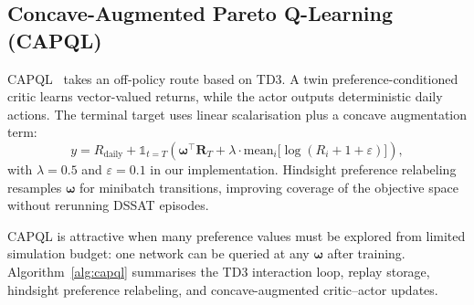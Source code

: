 \subsection{Concave-Augmented Pareto Q-Learning (CAPQL)}
\label{subsec:capql}

CAPQL~\cite{lu2023capql} takes an off-policy route based on TD3. A twin
preference-conditioned critic learns vector-valued returns, while the actor
outputs deterministic daily actions. The terminal target uses linear
scalarisation plus a concave augmentation term:
\begin{equation}
  y = R_{\text{daily}} + \mathbb{1}_{t=T}\!\left(
    \boldsymbol{\omega}^{\top}\mathbf{R}_T
    + \lambda \cdot \mathrm{mean}_i\big[\log(R_i + 1 + \varepsilon)\big]
  \right),
  \label{eq:capql_target}
\end{equation}
with $\lambda=0.5$ and $\varepsilon=0.1$ in our implementation. Hindsight
preference relabeling resamples $\boldsymbol{\omega}$ for minibatch
transitions, improving coverage of the objective space without rerunning
DSSAT episodes.

CAPQL is attractive when many preference values must be explored from limited
simulation budget: one network can be queried at any $\boldsymbol{\omega}$ after
training.
Algorithm~\ref{alg:capql} summarises the TD3 interaction loop, replay storage,
hindsight preference relabeling, and concave-augmented critic--actor updates.

